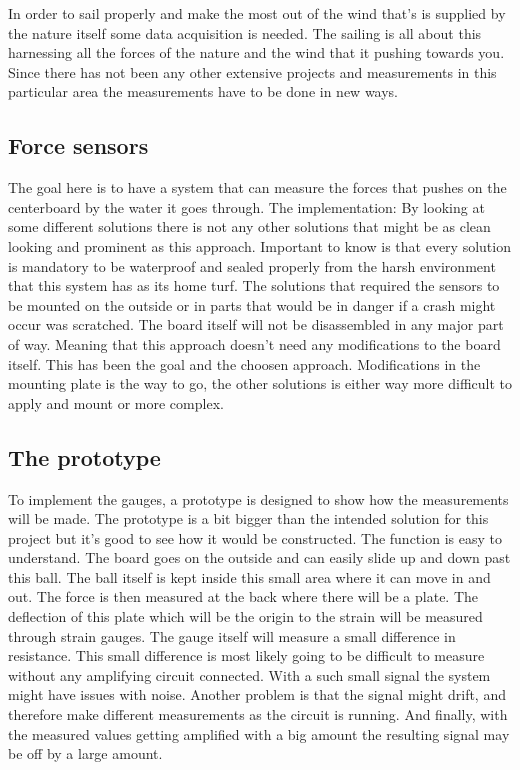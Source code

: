 
In order to sail properly and make the most out of the wind that’s is supplied by the nature itself some data acquisition is needed. The sailing is all about this harnessing all the forces of the nature and the wind that it pushing towards you. Since there has not been any other extensive projects and measurements in this particular area the measurements have to be done in new ways. 

\subsection{Force sensors}

The goal here is to have a system that can measure the forces that pushes on the centerboard by the water it goes through. 
The implementation:
By looking at some different solutions there is not any other solutions that might be as clean looking and prominent as this approach. Important to know is that every solution is mandatory to be waterproof and sealed properly from the harsh environment that this system has as its home turf. The solutions that required the sensors to be mounted on the outside or in parts that would be in danger if a crash might occur was scratched.  
The board itself will not be disassembled in any major part of way. Meaning that this approach doesn’t need any modifications to the board itself. This has been the goal and the choosen approach. Modifications in the mounting plate is the way to go, the other solutions is either way more difficult to apply and mount or more complex.

\subsection{The prototype}
To implement the gauges, a prototype is designed to show how the measurements will be made. The prototype is a bit bigger than the intended solution for this project but it's good to see how it would be constructed. The function is easy to understand. The board goes on the outside and can easily slide up and down past this ball.  The ball itself is kept inside this small area where it can move in and out. The force is then measured at the back where there will be a plate. The deflection of this plate which will be the origin to the strain will be measured through strain gauges. 
The gauge itself will measure a small difference in resistance. This small difference is most likely going to be difficult to measure without any amplifying circuit connected. With a such small signal the system might have issues with noise. Another problem is that the signal might drift, and therefore make different measurements as the circuit is running. And finally, with the measured values getting amplified with a big amount the resulting signal may be off by a large amount.
 
